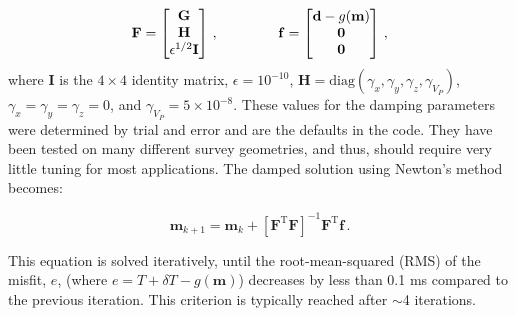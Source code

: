 \begin{equation}
	\mathbf{F} = 
	\left[\begin{matrix}
	\mathbf{G}\\\mathbf{H}\\\epsilon^{1/2}\mathbf{I}
	\end{matrix}\right] \,,
	\hspace{15mm}
	\mathbf{f} = 
	\left[\begin{matrix}
	\mathbf{d} - g(\mathbf{m})\\\mathbf{0}\\\mathbf{0}
	\end{matrix}\right] \,,
\end{equation}
where $\mathbf{I}$ is the $4\times 4$ identity matrix, $\epsilon = 10^{-10}$, $\mathbf{H}=\text{diag}\left( \gamma_{x}, \gamma_{y}, \gamma_{z}, \gamma_{V_P} \right)$, $\gamma_{x}=\gamma_{y}=\gamma_{z}=0$, and $\gamma_{V_P} = 5\times10^{-8}$. These values for the damping parameters were determined by trial and error and are the defaults in the code. They have been tested on many different survey geometries, and thus, should require very little tuning for most applications. The damped solution using Newton's method becomes:

\begin{equation}
	\mathbf{m}_{k+1} = \mathbf{m}_k + \left[ \mathbf{F}^{\text{T}} \mathbf{F} \right]^{-1} \mathbf{F}^{\text{T}} \mathbf{f} \,. \label{eq:inverse}
\end{equation}

This equation is solved iteratively, until the root-mean-squared (RMS) of the misfit, $e$, (where $e = T+\delta T-g(\mathbf{m})$) decreases by less than 0.1 ms compared to the previous iteration. This criterion is typically reached after $\sim$4 iterations. 

